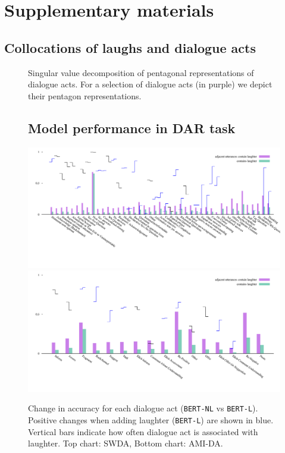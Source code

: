 \documentclass[11pt,a4paper]{article}
\begin{document}
\section{Supplementary materials}\label{sec:suppl}

\subsection{Collocations of laughs and dialogue acts}
\label{sec:app:da-svd}


\begin{figure}[h!]
  \centering
  \fontsize{6}{10}\selectfont
  \sffamily
  
  \caption{Singular value decomposition of pentagonal representations of dialogue acts. For a selection of dialogue acts (in purple) we depict their pentagon representations.}
    \label{fig:da-svd}
\end{figure}

\pagebreak

\begin{figure}[h!]
\subsection{Model performance in DAR task}
\label{sec:app:bert}

  \centering
  \includegraphics[width=\linewidth]{img/SWDA-bertLvsNL.pdf}
  \includegraphics[width=\linewidth]{img/AMI-DA-bertLvsNL.pdf}
  \caption{Change in accuracy for each dialogue act (\texttt{BERT-NL} vs \texttt{BERT-L}). Positive changes when adding laughter (\texttt{BERT-L}) are shown in blue. Vertical bars indicate how often dialogue act is associated with laughter. Top chart: SWDA, Bottom chart: AMI-DA. }
    \label{fig:by-da}
\end{figure}
\end{document}
